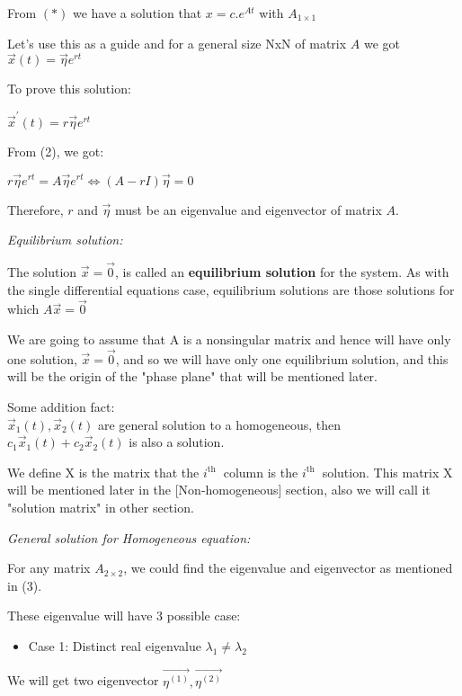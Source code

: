 \documentclass[a4paper]{article}
\begin{document}
From $(*)$ we have a solution that $x=c . e^{A t}$ with $A_{1 \times 1}$

Let's use this as a guide and for a general size NxN of matrix $A$ we got $\vec{x}(t)=\vec{\eta} e^{r t}$

To prove this solution:

$\vec{x}^{\prime}(t)=r \vec{\eta} e^{r t}$

From (2), we got:

$r \vec{\eta} e^{r t}=A \vec{\eta} e^{r t} \Leftrightarrow(A-r I) \vec{\eta}=0$

Therefore, $r$ and $\vec{\eta}$ must be an eigenvalue and eigenvector of matrix $A$.

{\it  Equilibrium solution:}

The solution $\vec{x}=\overrightarrow{0}$, is called an \textbf{equilibrium solution} for the system. As with the single differential equations case, equilibrium solutions are those solutions for which $A \vec{x}=\overrightarrow{0}$

We are going to assume that $\mathrm{A}$ is a nonsingular matrix and hence will have only one solution, $\vec{x}=\overrightarrow{0}$, and so we will have only one equilibrium solution, and this will be the origin of the "phase plane" that will be mentioned later.

Some addition fact: \\
\enskip \enskip \enskip $\vec{x}_{1}(t), \vec{x}_{2}(t)$ are general solution to a homogeneous, then $c_{1} \vec{x}_{1}(t)+c_{2} \vec{x}_{2}(t)$ is also a solution.

We define $\mathrm{X}$ is the matrix that the $i^{\text {th }}$ column is the $i^{\text {th }}$ solution. This matrix $\mathrm{X}$ will be mentioned later in the [Non-homogeneous] section, also we will call it "solution matrix" in other section.

{\it  General solution for Homogeneous equation:}

For any matrix $A_{2 \times 2}$, we could find the eigenvalue and eigenvector as mentioned in (3).

These eigenvalue will have 3 possible case:

\begin{itemize}
	\item Case 1: Distinct real eigenvalue $\lambda_{1} \neq \lambda_{2}$
\end{itemize}

We will get two eigenvector $\overrightarrow{\eta^{(1)}}, \overrightarrow{\eta^{(2)}}$
\end{document}
